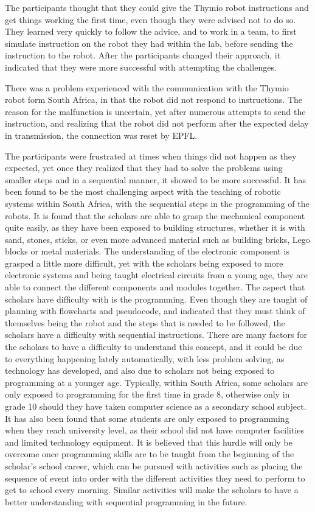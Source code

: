 \documentclass{intech-journal}
\begin{document}
The participants thought that they could give the Thymio robot instructions and get things working the first time, even though they were advised not to do so. They learned very quickly to follow the advice, and to work in a team, to first simulate instruction on the robot they had within the lab, before sending the instruction to the robot. After the participants changed their approach, it indicated that they were more successful with attempting the challenges. 

There was a problem experienced with the communication with the Thymio robot form South Africa, in that the robot did not respond to instructions. The reason for the malfunction is uncertain, yet after numerous attempts to send the instruction, and realizing that the robot did not perform after the expected delay in transmission, the connection was reset by EPFL.

The participants were frustrated at times when things did not happen as they expected, yet once they realized that they had to solve the problems using smaller steps and in a sequential manner, it showed to be more successful. It has been found to be the most challenging aspect with the teaching of robotic systems within South Africa, with the sequential steps in the programming of the robots. It is found that the scholars are able to grasp the mechanical component quite easily, as they have been exposed to building structures, whether it is with sand, stones, sticks, or even more advanced material such as building bricks, Lego blocks or metal materials. The understanding of the electronic component is grasped a little more difficult, yet with the scholars being exposed to more electronic systems and being taught electrical circuits from a young age, they are able to connect the different components and modules together. The aspect that scholars have difficulty with is the programming. Even though they are taught of planning with flowcharts and pseudocode, and indicated that they must think of themselves being the robot and the steps that is needed to be followed, the scholars have a difficulty with sequential instructions. There are many factors for the scholars to have a difficulty to understand this concept, and it could be due to everything happening lately automatically, with less problem solving, as technology has developed, and also due to scholars not being exposed to programming at a younger age. Typically, within South Africa, some scholars are only exposed to programming for the first time in grade 8, otherwise only in grade 10 should they have taken computer science as a secondary school subject. It has also been found that some students are only exposed to programming when they reach university level, as their school did not have computer facilities and limited technology equipment. It is believed that this hurdle will only be overcome once programming skills are to be taught from the beginning of the scholar’s school career, which can be pursued with activities such as placing the sequence of event into order with the different activities they need to perform to get to school every morning. Similar activities will make the scholars to have a better understanding with sequential programming in the future.


{}
\end{document}
